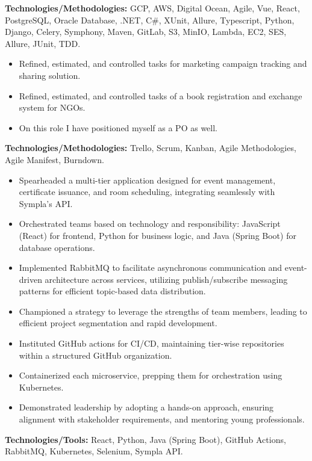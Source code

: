 \documentclass[10pt,a4paper]{altacv}
\begin{document}
\textbf{Technologies/Methodologies:} GCP, AWS, Digital Ocean, Agile, Vue, React, PostgreSQL, Oracle Database, .NET, C\#, XUnit, Allure, Typescript, Python, Django, Celery, Symphony, Maven, GitLab, S3, MinIO, Lambda, EC2, SES, Allure, JUnit, TDD.
\vspace{5mm}

\begin{itemize}
    \setlength{\itemindent}{0.5em}
    \item[--] Refined, estimated, and controlled tasks for marketing campaign tracking and sharing solution.
    \item[--] Refined, estimated, and controlled tasks of a book registration and exchange system for NGOs.
    \item[--] On this role I have positioned myself as a PO as well.
\end{itemize}
\textbf{Technologies/Methodologies:} Trello, Scrum, Kanban, Agile Methodologies, Agile Manifest, Burndown.
\vspace{5mm}


\begin{itemize}
    \setlength{\itemindent}{0.5em}
    \item[--] Spearheaded a multi-tier application designed for event management, certificate issuance, and room scheduling, integrating seamlessly with Sympla's API.
    \item[--] Orchestrated teams based on technology and responsibility: JavaScript (React) for frontend, Python for business logic, and Java (Spring Boot) for database operations.
    \item[--] Implemented RabbitMQ to facilitate asynchronous communication and event-driven architecture across services, utilizing publish/subscribe messaging patterns for efficient topic-based data distribution.
    
\break
{}

    \item[--] Championed a strategy to leverage the strengths of team members, leading to efficient project segmentation and rapid development.
    \item[--] Instituted GitHub actions for CI/CD, maintaining tier-wise repositories within a structured GitHub organization.
    \item[--] Containerized each microservice, prepping them for orchestration using Kubernetes.
    \item[--] Demonstrated leadership by adopting a hands-on approach, ensuring alignment with stakeholder requirements, and mentoring young professionals.
\end{itemize}
\textbf{Technologies/Tools:} React, Python, Java (Spring Boot), GitHub Actions, RabbitMQ, Kubernetes, Selenium, Sympla API.
\end{document}
